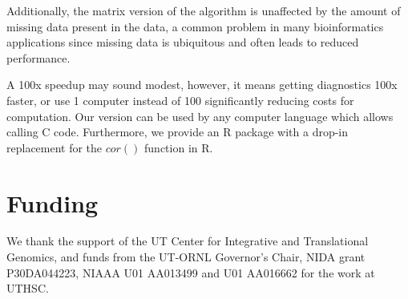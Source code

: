 \documentclass{bioinfo}
\begin{document}
Additionally, the matrix version of the algorithm is unaffected by the 
amount of missing data present in the data, a common problem in many 
bioinformatics applications since missing data is ubiquitous and often 
leads to reduced performance.

A 100x speedup may sound modest, however, it means getting diagnostics 100x 
faster, or use 1 computer instead of 100 significantly reducing costs for 
computation. Our version can be used by any computer language which allows 
calling C code. Furthermore, we provide an R package with a drop-in replacement 
for the $cor()$ function in R.

\section*{Funding}

We thank the support of the UT Center for Integrative and Translational Genomics, 
and funds from the UT-ORNL Governor's Chair, NIDA grant P30DA044223, NIAAA U01 
AA013499 and U01 AA016662 for the work at UTHSC. \vspace*{-12pt}


%
%
%
%

%

\end{document}
